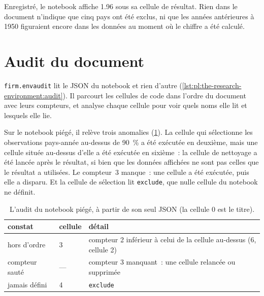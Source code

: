 Enregistré, le notebook affiche 1.96 sous sa cellule de résultat. Rien dans le document n'indique que cinq pays ont été exclus, ni que les années antérieures
à 1950 figuraient encore dans les données au moment où le chiffre a été calculé.

\section{Audit du document}

\texttt{firm.envaudit} lit le JSON du notebook et rien d'autre (\cref{lst:pl:the-research-environment:audit}). Il parcourt les cellules de code
dans l'ordre du document avec leurs compteurs, et analyse chaque cellule pour voir quels noms elle lit et lesquels elle lie.

\label{lst:pl:the-research-environment:audit}

Sur le notebook piégé, il relève trois anomalies (\cref{tab:pl:the-research-environment:audit}). La cellule qui sélectionne les observations pays-année au-dessus de 90~\%
a été exécutée en deuxième, mais une cellule située au-dessus d'elle a été exécutée en sixième~: la cellule de nettoyage a été lancée après le résultat, si bien que les données affichées ne sont pas celles que le résultat
a utilisées. Le compteur~3 manque~: une cellule a été exécutée, puis elle a disparu. Et la cellule de sélection lit \texttt{exclude}, que nulle cellule du notebook ne définit.

\begin{table}[ht]
\centering\small
\begin{tabular}{llp{7.4cm}}
\toprule
constat & cellule & détail \\
\midrule
hors d'ordre & 3 & compteur 2 inférieur à celui de la cellule au-dessus (6, cellule 2) \\
compteur sauté & --- & compteur 3 manquant~: une cellule relancée ou supprimée \\
jamais défini & 4 & \texttt{exclude} \\
\bottomrule
\end{tabular}
\caption{L'audit du notebook piégé, à partir de son seul JSON (la cellule 0 est le titre).}\label{tab:pl:the-research-environment:audit}
\end{table}

